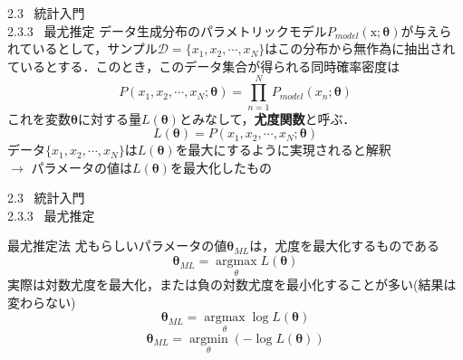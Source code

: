 \documentclass[dvipdfmx,10pt]{beamer}
\begin{document}
  \begin{frame}[t]{2.3 \ 統計入門 \\ \normalsize{2.3.3 \ 最尤推定}}
    データ生成分布のパラメトリックモデル$P_{model}(\mathrm{x};\bm{\theta})$が与えられているとして，サンプル$\mathcal{D}=\{x_1,x_2,\cdots,x_N\}$はこの分布から無作為に抽出されているとする．このとき，このデータ集合が得られる同時確率密度は
    \begin{equation*}
      P(x_1,x_2,\cdots,x_N;\bm{\theta}) = \prod_{n=1}^{N}P_{model}(x_n;\bm{\theta})
    \end{equation*}
    これを変数$\bm{\theta}$に対する量$L(\bm{\theta})$とみなして，\textbf{尤度関数}と呼ぶ．
    \begin{equation*}
      L(\bm{\theta}) = P(x_1,x_2,\cdots,x_N;\bm{\theta})
    \end{equation*}
    データ$\{x_1,x_2,\cdots,x_N\}$は$L(\bm{\theta})$を最大にするように実現されると解釈\\
    $\rightarrow$ パラメータの値は$L(\bm{\theta})$を最大化したもの
  \end{frame}

  \begin{frame}[t]{2.3 \ 統計入門 \\ \normalsize{2.3.3 \ 最尤推定}}
    \begin{block}{最尤推定法}
      尤もらしいパラメータの値$\bm{\theta}_{ML}$は，尤度を最大化するものである
      \begin{equation*}
        \bm{\theta}_{ML} = \underset{\theta} {\operatorname{argmax}} L(\bm{\theta})
      \end{equation*}
      実際は対数尤度を最大化，または負の対数尤度を最小化することが多い(結果は変わらない)
      \begin{equation*}
        \bm{\theta}_{ML} = \underset{\theta} {\operatorname{argmax}} \log{L(\bm{\theta})}
      \end{equation*}
      \begin{equation*}
        \bm{\theta}_{ML} = \underset{\theta} {\operatorname{argmin}} (-\log{L(\bm{\theta})})
      \end{equation*}
    \end{block}
  \end{frame}
\end{document}
